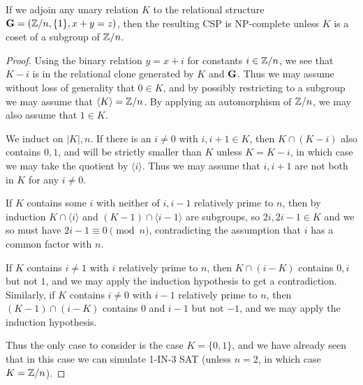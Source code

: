 \documentclass[letterpaper,11pt]{article}
\DeclareMathOperator{\Clo}{Clo}
\begin{document}
\begin{prop} If we adjoin any unary relation $K$ to the relational structure $\mathbf{G} = (\mathbb{Z}/n, \{1\}, x+y=z)$, then the resulting CSP is NP-complete unless $K$ is a coset of a subgroup of $\mathbb{Z}/n$.
\end{prop}
\begin{proof} Using the binary relation $y = x+i$ for constants $i \in \mathbb{Z}/n$, we see that $K-i$ is in the relational clone generated by $K$ and $\mathbf{G}$. Thus we may assume without loss of generality that $0 \in K$, and by possibly restricting to a subgroup we may assume that $\langle K\rangle = \mathbb{Z}/n$. By applying an automorphism of $\mathbb{Z}/n$, we may also assume that $1 \in K$.

We induct on $|K|, n$. If there is an $i \ne 0$ with $i,i+1 \in K$, then $K \cap (K-i)$ also contains $0,1$, and will be strictly smaller than $K$ unless $K = K-i$, in which case we may take the quotient by $\langle i\rangle$. Thus we may assume that $i,i+1$ are not both in $K$ for any $i \ne 0$.

If $K$ contains some $i$ with neither of $i,i-1$ relatively prime to $n$, then by induction $K\cap \langle i\rangle$ and $(K-1)\cap \langle i-1\rangle$ are subgroups, so $2i, 2i-1 \in K$ and we so must have $2i-1 \equiv 0 \pmod{n}$, contradicting the assumption that $i$ has a common factor with $n$.

If $K$ contains $i\ne 1$ with $i$ relatively prime to $n$, then $K\cap (i-K)$ contains $0,i$ but not $1$, and we may apply the induction hypothesis to get a contradiction. Similarly, if $K$ contains $i\ne 0$ with $i-1$ relatively prime to $n$, then $(K-1)\cap (i-K)$ contains $0$ and $i-1$ but not $-1$, and we may apply the induction hypothesis.

Thus the only case to consider is the case $K = \{0,1\}$, and we have already seen that in this case we can simulate 1-IN-3 SAT (unless $n=2$, in which case $K = \mathbb{Z}/n$).
\begin{comment}
Suppose that $\phi$ is any $k$-ary polymorphism of $\fG$ which is not a projection. We will show that $x-y+z \in \Clo(\phi)$, so if $\phi$ preserves $K$ then $K$ is a coset of a subgroup. Since $\phi$ preserves $x+y=z$ $\phi$ is linear, so there exist $r_1, ..., r_k \in \ZZ/n$ such that
\[
\phi(x_1, ..., x_k) = \sum_i r_ix_i,
\]
and since $\phi$ preserves $\{1\}$ we have $\sum_i r_i = 1$. Assume without loss of generality that no $r_i$ is $0$. If all the $r_i$ are equal to $1$, then $k \equiv 1\pmod{n}$ and $\phi(x,y,...,y,z) = x + (k-2)y + z = x-y+z$.

Otherwise, some $r_i \ne 0,1$, so if we set $f(x,y) = \phi(y,...,y,x,y,...,y)$ with the $x$ in the $i$th position, we get $f(x,y) = r_ix + (1-r_i)y$. Let $r = r_i$. At least one of $r, 1-r$ is relatively prime to $n$, assume without loss of generality that it is $r$. Then by iterating $f$ in the first variable, i.e. by considering expressions of the form $f(\cdots f(f(x,y),y)\cdots, y)$, we see that $r^jx + (1-r^j)y \in \Clo(f)$ for each $j$, so in particular $f^-(x,y) = r^{-1}x + (1-r^{-1})y \in \Clo(f)$. Then $f(f^-(x,y),z) = x + (r-1)y + (1-r)z$.
\end{comment}
\end{proof}
\end{document}
